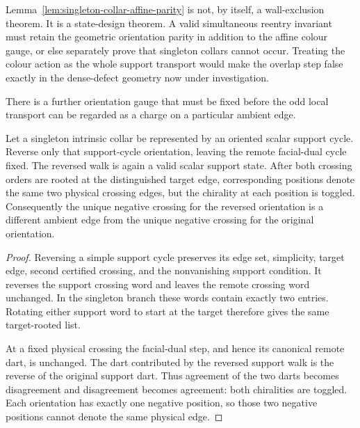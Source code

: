 Lemma~\ref{lem:singleton-collar-affine-parity} is not, by itself, a
wall-exclusion theorem.  It is a state-design theorem.  A valid simultaneous
reentry invariant must retain the geometric orientation parity in addition
to the affine colour gauge, or else separately prove that singleton collars
cannot occur.  Treating the colour action as the whole support transport
would make the overlap step false exactly in the dense-defect geometry now
under investigation.

There is a further orientation gauge that must be fixed before the odd local
transport can be regarded as a charge on a particular ambient edge.

\begin{lemma}
\label{lem:singleton-collar-orientation-gauge}
Let a singleton intrinsic collar be represented by an oriented scalar support
cycle.  Reverse only that support-cycle orientation, leaving the remote
facial-dual cycle fixed.  The reversed walk is again a valid scalar support
state.  After both crossing orders are rooted at the distinguished target
edge, corresponding positions denote the same two physical crossing edges,
but the chirality at each position is toggled.  Consequently the unique
negative crossing for the reversed orientation is a different ambient edge
from the unique negative crossing for the original orientation.

\end{lemma}

\begin{proof}
Reversing a simple support cycle preserves its edge set, simplicity, target
edge, second certified crossing, and the nonvanishing support condition.  It
reverses the support crossing word and leaves the remote crossing word
unchanged.  In the singleton branch these words contain exactly two entries.
Rotating either support word to start at the target therefore gives the same
target-rooted list.

At a fixed physical crossing the facial-dual step, and hence its canonical
remote dart, is unchanged.  The dart contributed by the reversed support walk
is the reverse of the original support dart.  Thus agreement of the two darts
becomes disagreement and disagreement becomes agreement: both chiralities are
toggled.  Each orientation has exactly one negative position, so those two
negative positions cannot denote the same physical edge.
\end{proof}

